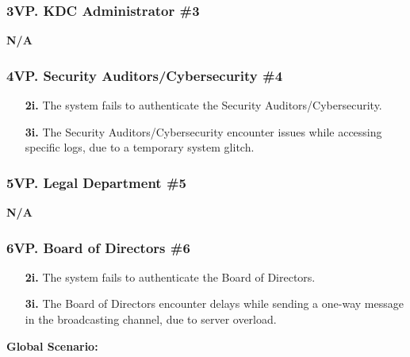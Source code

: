 \documentclass[]{article}
\begin{document}
\subsubsection*{3VP. KDC Administrator \#3}
\textbf{N/A}
\subsubsection*{4VP. Security Auditors/Cybersecurity \#4}
\begin{enumerate}
	\item[\textbf{2i.}] The system fails to authenticate the Security Auditors/Cybersecurity.
	\item[\textbf{3i.}] The Security Auditors/Cybersecurity encounter issues while accessing specific logs, due to a temporary system glitch.
\end{enumerate}
\subsubsection*{5VP. Legal Department \#5}
\textbf{N/A}
\subsubsection*{6VP. Board of Directors \#6}
\begin{enumerate}
	\item[\textbf{2i.}] The system fails to authenticate the Board of Directors.
	\item[\textbf{3i.}] The Board of Directors encounter delays while sending a one-way message in the broadcasting channel, due to server overload.
\end{enumerate}
\textbf{Global Scenario:}
\end{document}
